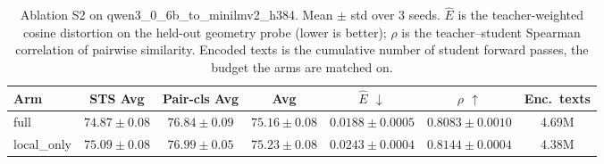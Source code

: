 \begin{table}[t]
\centering
\caption{Ablation S2 on qwen3\_0\_6b\_to\_minilmv2\_h384. Mean $\pm$ std over 3 seeds. $\hat{E}$ is the teacher-weighted cosine distortion on the held-out geometry probe (lower is better); $\rho$ is the teacher--student Spearman correlation of pairwise similarity. Encoded texts is the cumulative number of student forward passes, the budget the arms are matched on.}
\label{tab:ablation_s2_qwen3_0_6b_to_minilmv2_h384}
\begin{tabular}{lcccccc}
\toprule
Arm & STS Avg & Pair-cls Avg & Avg & $\hat{E}$ $\downarrow$ & $\rho$ $\uparrow$ & Enc.\ texts \\
\midrule
full & $74.87 \pm 0.08$ & $76.84 \pm 0.09$ & $75.16 \pm 0.08$ & $0.0188 \pm 0.0005$ & $0.8083 \pm 0.0010$ & 4.69M \\
local\_only & $75.09 \pm 0.08$ & $76.99 \pm 0.05$ & $75.23 \pm 0.08$ & $0.0243 \pm 0.0004$ & $0.8144 \pm 0.0004$ & 4.38M \\
\bottomrule
\end{tabular}
\end{table}
